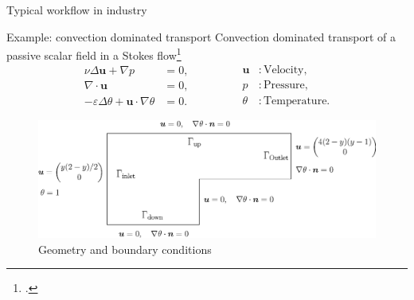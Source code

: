 \documentclass[aspectratio=169]{beamer}
\begin{document}
\begin{frame}{Typical workflow in industry}
\begin{itemize}
\begin{figure}[t]
\begin{subfigure}[t]{0.4\textwidth}
		\end{subfigure}
	\end{figure}
	\end{itemize}
\end{frame}

\begin{frame}{Example: convection dominated transport}
	Convection dominated transport of a passive scalar field in a Stokes flow\footcite{volker2017review}
	\begin{equation*}
		\begin{aligned}
			\nu \Delta \bm{u} + \nabla p &=0, \\
			\nabla \cdot \bm{u} &=0, \\
			-\varepsilon \Delta \theta + \bm{u} \cdot \nabla \theta &=0.
		\end{aligned} \qquad \qquad 
	\begin{aligned}
		\bm{u} &: \text{Velocity}, \\
		p &: \text{Pressure}, \\
		\theta &: \text{Temperature}.
	\end{aligned}
	\end{equation*}
	\begin{figure}
		\centering
		\includegraphics[width=.75\textwidth]{channel_convection_T.eps}
		\caption*{Geometry and boundary conditions}
	\end{figure}
\end{frame}
\end{document}
